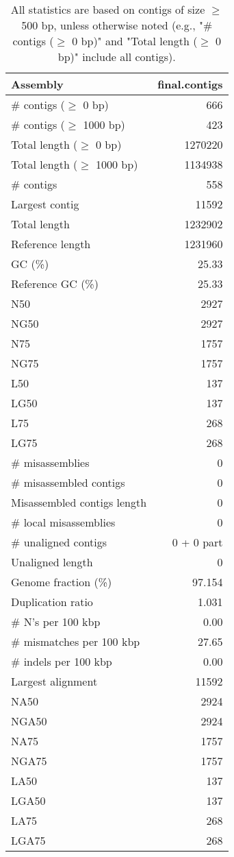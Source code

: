 \documentclass[12pt,a4paper]{article}
\begin{document}
\begin{table}[ht]
\begin{center}
\caption{All statistics are based on contigs of size $\geq$ 500 bp, unless otherwise noted (e.g., "\# contigs ($\geq$ 0 bp)" and "Total length ($\geq$ 0 bp)" include all contigs).}
\begin{tabular}{|l*{1}{|r}|}
\hline
Assembly & final.contigs \\ \hline
\# contigs ($\geq$ 0 bp) & 666 \\ \hline
\# contigs ($\geq$ 1000 bp) & 423 \\ \hline
Total length ($\geq$ 0 bp) & 1270220 \\ \hline
Total length ($\geq$ 1000 bp) & 1134938 \\ \hline
\# contigs & 558 \\ \hline
Largest contig & 11592 \\ \hline
Total length & 1232902 \\ \hline
Reference length & 1231960 \\ \hline
GC (\%) & 25.33 \\ \hline
Reference GC (\%) & 25.33 \\ \hline
N50 & 2927 \\ \hline
NG50 & 2927 \\ \hline
N75 & 1757 \\ \hline
NG75 & 1757 \\ \hline
L50 & 137 \\ \hline
LG50 & 137 \\ \hline
L75 & 268 \\ \hline
LG75 & 268 \\ \hline
\# misassemblies & 0 \\ \hline
\# misassembled contigs & 0 \\ \hline
Misassembled contigs length & 0 \\ \hline
\# local misassemblies & 0 \\ \hline
\# unaligned contigs & 0 + 0 part \\ \hline
Unaligned length & 0 \\ \hline
Genome fraction (\%) & 97.154 \\ \hline
Duplication ratio & 1.031 \\ \hline
\# N's per 100 kbp & 0.00 \\ \hline
\# mismatches per 100 kbp & 27.65 \\ \hline
\# indels per 100 kbp & 0.00 \\ \hline
Largest alignment & 11592 \\ \hline
NA50 & 2924 \\ \hline
NGA50 & 2924 \\ \hline
NA75 & 1757 \\ \hline
NGA75 & 1757 \\ \hline
LA50 & 137 \\ \hline
LGA50 & 137 \\ \hline
LA75 & 268 \\ \hline
LGA75 & 268 \\ \hline
\end{tabular}
\end{center}
\end{table}
\end{document}
